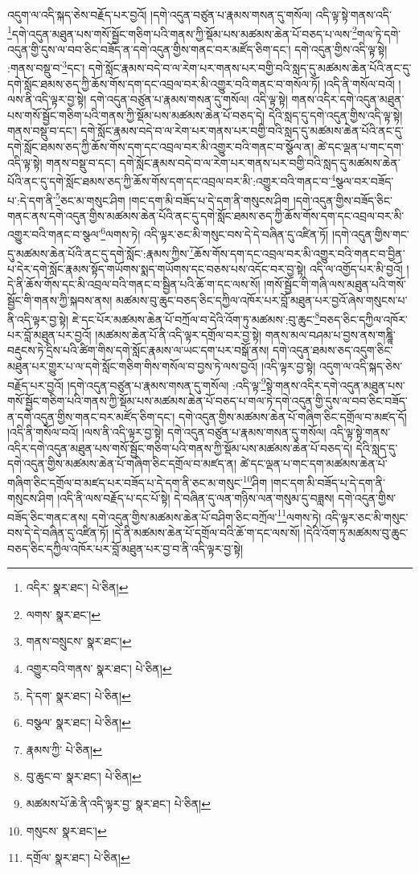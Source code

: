 འདུག་ལ་འདི་སྐད་ཅེས་བརྗོད་པར་བྱའོ། །དགེ་འདུན་བཙུན་པ་རྣམས་གསན་དུ་གསོལ། འདི་ལྟ་སྟེ་གནས་འདི་\footnote{འདིར་  སྣར་ཐང་།  པེ་ཅིན། }དགེ་འདུན་མཐུན་པས་གསོ་སྦྱོང་གཅིག་པའི་གནས་ཀྱི་སྡོམ་པས་མཚམས་ཆེན་པོ་བཅད་པ་ལས་\footnote{ལགས་  སྣར་ཐང་། }གལ་ཏེ་དགེ་འདུན་གྱི་དུས་ལ་བབ་ཅིང་བཟོད་ན་དགེ་འདུན་གྱིས་གནང་བར་མཛོད་ཅིག་དང་། དགེ་འདུན་གྱིས་འདི་ལྟ་སྟེ། :གནས་བསྡུ་བ་\footnote{གནས་བསྲུངས་  སྣར་ཐང་། }དང་། དགེ་སློང་རྣམས་བདེ་བ་ལ་རེག་པར་གནས་པར་བགྱི་བའི་སླད་དུ་མཚམས་ཆེན་པོའི་ནང་དུ་དགེ་སློང་ཐམས་ཅད་ཀྱི་ཆོས་གོས་དག་དང་འབྲལ་བར་མི་འགྱུར་བའི་གནང་བ་གསོལ་ཏོ། །འདི་ནི་གསོལ་བའོ། །ལས་ནི་འདི་ལྟར་བྱ་སྟེ། དགེ་འདུན་བཙུན་པ་རྣམས་གསན་དུ་གསོལ། འདི་ལྟ་སྟེ། གནས་འདིར་དགེ་འདུན་མཐུན་པས་གསོ་སྦྱོང་གཅིག་པའི་གནས་ཀྱི་སྡོམ་པས་མཚམས་ཆེན་པོ་བཅད་དེ། དེའི་སླད་དུ་དགེ་འདུན་གྱིས་འདི་ལྟ་སྟེ། གནས་བསྡུ་བ་དང་། དགེ་སློང་རྣམས་བདེ་བ་ལ་རེག་པར་གནས་པར་བགྱི་བའི་སླད་དུ་མཚམས་ཆེན་པོའི་ནང་དུ་དགེ་སློང་ཐམས་ཅད་ཀྱི་ཆོས་གོས་དག་དང་འབྲལ་བར་མི་འགྱུར་བའི་གནང་བ་སྩོལ་ན། ཚེ་དང་ལྡན་པ་གང་དག་འདི་ལྟ་སྟེ། གནས་བསྡུ་བ་དང་། དགེ་སློང་རྣམས་བདེ་བ་ལ་རེག་པར་གནས་པར་བགྱི་བའི་སླད་དུ་མཚམས་ཆེན་པོའི་ནང་དུ་དགེ་སློང་ཐམས་ཅད་ཀྱི་ཆོས་གོས་དག་དང་འབྲལ་བར་མི་:འགྱུར་བའི་གནང་བ་\footnote{འགྱུར་བའི་གནས་  སྣར་ཐང་།  པེ་ཅིན། }སྩལ་བར་བཟོད་པ་:དེ་དག་ནི་\footnote{དེ་དག་  སྣར་ཐང་།  པེ་ཅིན། }ཅང་མ་གསུང་ཤིག །གང་དག་མི་བཟོད་པ་དེ་དག་ནི་གསུངས་ཤིག །དགེ་འདུན་གྱིས་བཟོད་ཅིང་གནང་ནས་དགེ་འདུན་གྱིས་མཚམས་ཆེན་པོའི་ནང་དུ་དགེ་སློང་ཐམས་ཅད་ཀྱི་ཆོས་གོས་དག་དང་འབྲལ་བར་མི་འགྱུར་བའི་གནང་བ་སྩལ་\footnote{བསྩལ་  སྣར་ཐང་།  པེ་ཅིན། }ལགས་ཏེ། འདི་ལྟར་ཅང་མི་གསུང་བས་དེ་དེ་བཞིན་དུ་འཛིན་ཏོ། །དགེ་འདུན་གྱིས་གང་དུ་མཚམས་ཆེན་པོའི་ནང་དུ་དགེ་སློང་:རྣམས་ཀྱིས་\footnote{རྣམས་ཀྱི་  པེ་ཅིན། }ཆོས་གོས་དག་དང་འབྲལ་བར་མི་འགྱུར་བའི་གནང་བ་བྱིན་པ་དེར་དགེ་སློང་རྣམས་སྟོད་གཡོགས་སྨད་གཡོགས་དང་བཅས་པས་འདོང་བར་བྱ་སྟེ། འདི་ལ་འགྱོད་པར་མི་བྱའོ། །དེ་ནི་ཆོས་གོས་དང་མི་འབྲལ་བའི་གནང་བ་སྦྱིན་པའི་ཆོ་ག་དང་ལས་སོ། །གསོ་སྦྱོང་གི་གཞི་ལས་མཐུན་པའི་གསོ་སྦྱོང་གི་གནས་ཀྱི་སྐབས་ནས། མཚམས་བུ་ཆུང་བཅད་ཅིང་དཀྱིལ་འཁོར་པར་བློ་མཐུན་པར་བྱའོ་ཞེས་གསུངས་པ་ནི་འདི་ལྟར་བྱ་སྟེ། ཇེ་དང་པོར་མཚམས་ཆེན་པོ་བཀྲོལ་བ་དེའི་འོག་ཏུ་མཚམས་:བུ་ཆུང་\footnote{བུ་ཆུང་བ་  སྣར་ཐང་།  པེ་ཅིན། }བཅད་ཅིང་དཀྱིལ་འཁོར་པར་བློ་མཐུན་པར་བྱའོ། །མཚམས་ཆེན་པོ་ནི་འདི་ལྟར་དགྲོལ་བར་བྱ་སྟེ། གནས་མལ་བཤམ་པ་བྱས་ནས་གཎྜཱི་བརྡུངས་ཏེ་དྲིས་པའི་ཚིག་གིས་དགེ་སློང་རྣམས་ལ་ཡང་དག་པར་བསྒོ་ནས། དགེ་འདུན་ཐམས་ཅད་འདུག་ཅིང་མཐུན་པར་གྱུར་པ་ལ་དགེ་སློང་གཅིག་གིས་གསོལ་བ་བྱས་ཏེ་ལས་བྱའོ། །འདི་ལྟར་བྱ་སྟེ། འདུག་ལ་འདི་སྐད་ཅེས་བརྗོད་པར་བྱའོ། །དགེ་འདུན་བཙུན་པ་རྣམས་གསན་དུ་གསོལ། :འདི་ལྟ་\footnote{མཚམས་པོ་ཆེ་ནི་འདི་ལྟར་བྱ་  སྣར་ཐང་།  པེ་ཅིན། }སྟེ་གནས་འདིར་དགེ་འདུན་མཐུན་པས་གསོ་སྦྱོང་གཅིག་པའི་གནས་ཀྱི་སྡོམ་པས་མཚམས་ཆེན་པོ་བཅད་པ་གལ་ཏེ་དགེ་འདུན་གྱི་དུས་ལ་བབ་ཅིང་བཟོད་ན་དགེ་འདུན་གྱིས་གནང་བར་མཛོད་ཅིག་དང་། དགེ་འདུན་གྱིས་མཚམས་ཆེན་པོ་གཞིག་ཅིང་དགྲོལ་བ་མཛད་དོ། །འདི་ནི་གསོལ་བའོ། །ལས་ནི་འདི་ལྟར་བྱ་སྟེ། དགེ་འདུན་བཙུན་པ་རྣམས་གསན་དུ་གསོལ། འདི་ལྟ་སྟེ་གནས་འདིར་དགེ་འདུན་མཐུན་པས་གསོ་སྦྱོང་གཅིག་པའི་གནས་ཀྱི་སྡོམ་པས་མཚམས་ཆེན་པོ་བཅད་དེ། དེའི་སླད་དུ་དགེ་འདུན་གྱིས་མཚམས་ཆེན་པོ་གཞིག་ཅིང་དགྲོལ་བ་མཛད་ན། ཚེ་དང་ལྡན་པ་གང་དག་མཚམས་ཆེན་པོ་གཞིག་ཅིང་དགྲོལ་བ་མཛད་པར་བཟོད་པ་དེ་དག་ནི་ཅང་མ་གསུང་\footnote{གསུངས་  སྣར་ཐང་། }ཤིག །གང་དག་མི་བཟོད་པ་དེ་དག་ནི་གསུངས་ཤིག །འདི་ནི་ལས་བརྗོད་པ་དང་པོ་སྟེ། དེ་བཞིན་དུ་ལན་གཉིས་ལན་གསུམ་དུ་བཟླས། དགེ་འདུན་གྱིས་བཟོད་ཅིང་གནང་ནས། དགེ་འདུན་གྱིས་མཚམས་ཆེན་པོ་བཤིག་ཅིང་བཀྲོལ་\footnote{དགྲོལ་  སྣར་ཐང་།  པེ་ཅིན། }ལགས་ཏེ། འདི་ལྟར་ཅང་མི་གསུང་བས་དེ་དེ་བཞིན་དུ་འཛིན་ཏོ། །དེ་ནི་མཚམས་ཆེན་པོ་དགྲོལ་བའི་ཆོ་ག་དང་ལས་སོ། །དེའི་འོག་ཏུ་མཚམས་བུ་ཆུང་བཅད་ཅིང་དཀྱིལ་འཁོར་པར་བློ་མཐུན་པར་བྱ་བ་ནི་འདི་ལྟར་བྱ་སྟེ། 